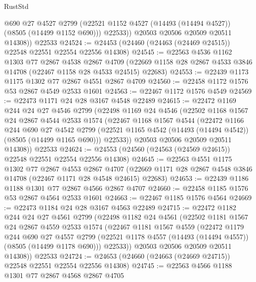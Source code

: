 \begin{lexlean}{RustStd}
\begin{coremodule}
            @690
            @27
            @4527
            @2799
            (@22521 @1152 @4527 (@14493 (@14494 @4527)) (@8505 (@14499 @1152 @690)))
            @22533))
        @20503
        @20506
        @20509
        @20511
        @14308))
    @22533
@24524 := @24453 (@24460 (@24463 (@24469 @24515)) @22548 @22551 @22554 @22556 @14308)
@24545 := @22563
    @4536
    @1162
    @1303
    @77
    @2867
    @4538
    @2867
    @4709
    (@22669 @1158 @28 @2867 @4533 @3846 @14708 (@22467 @1158 @28 @4533 @24515) @22683)
@24553 := @22439 @1173 @1175 @1302 @77 @2867 @4551 @2867 @4709
@24560 := @22458 @1172 @1576 @53 @2867 @4549 @2533 @1601
@24563 := @22467 @1172 @1576 @4549
@24569 := @22473 @1171 @24 @28 @3167 @4548 @22489
@24615 := @22472
    @1169
    @244
    @24
    @27
    @4546
    @2799
    (@22498
      @1169
      @24
      @4546
      (@22502
        @1168
        @1567
        @24
        @2867
        @4544
        @2533
        @1574
        (@22467
          @1168
          @1567
          @4544
          (@22472
            @1166
            @244
            @690
            @27
            @4542
            @2799
            (@22521 @1165 @4542 (@14493 (@14494 @4542)) (@8505 (@14499 @1165 @690)))
            @22533))
        @20503
        @20506
        @20509
        @20511
        @14308))
    @22533
@24624 := @24553 (@24560 (@24563 (@24569 @24615)) @22548 @22551 @22554 @22556 @14308)
@24645 := @22563
    @4551
    @1175
    @1302
    @77
    @2867
    @4553
    @2867
    @4707
    (@22669 @1171 @28 @2867 @4548 @3846 @14708 (@22467 @1171 @28 @4548 @24615) @22683)
@24653 := @22439 @1186 @1188 @1301 @77 @2867 @4566 @2867 @4707
@24660 := @22458 @1185 @1576 @53 @2867 @4564 @2533 @1601
@24663 := @22467 @1185 @1576 @4564
@24669 := @22473 @1184 @24 @28 @3167 @4563 @22489
@24715 := @22472
    @1182
    @244
    @24
    @27
    @4561
    @2799
    (@22498
      @1182
      @24
      @4561
      (@22502
        @1181
        @1567
        @24
        @2867
        @4559
        @2533
        @1574
        (@22467
          @1181
          @1567
          @4559
          (@22472
            @1179
            @244
            @690
            @27
            @4557
            @2799
            (@22521 @1178 @4557 (@14493 (@14494 @4557)) (@8505 (@14499 @1178 @690)))
            @22533))
        @20503
        @20506
        @20509
        @20511
        @14308))
    @22533
@24724 := @24653 (@24660 (@24663 (@24669 @24715)) @22548 @22551 @22554 @22556 @14308)
@24745 := @22563
    @4566
    @1188
    @1301
    @77
    @2867
    @4568
    @2867
    @4705

\end{coremodule}
\end{lexlean}

